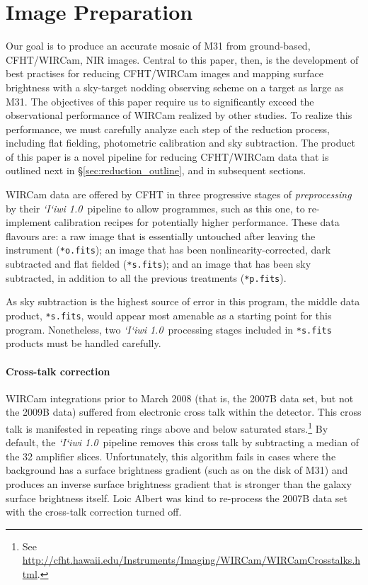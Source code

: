 \documentclass[iop]{emulateapj}
\newcommand{\sw}[1]{\textit{#1}} %
\newcommand{\iiwione}{\sw{`I`iwi 1.0}}
\newcommand{\androids}{\textsc{androids}}
\begin{document}

\section{Image Preparation}
\label{sec:reduction}

Our goal is to produce an accurate mosaic of M31 from ground-based, CFHT/WIRCam, NIR images.
Central to this paper, then, is the development of best practises for reducing CFHT/WIRCam images and mapping surface brightness with a sky-target nodding observing scheme on a target as large as M31.
The objectives of this paper require us to significantly exceed the observational performance of WIRCam realized by other studies.
To realize this performance, we must carefully analyze each step of the reduction process, including flat fielding, photometric calibration and sky subtraction.
The product of this paper is a novel pipeline for reducing CFHT/WIRCam data that is outlined next in \S\ref{sec:reduction_outline}, and in subsequent sections.

WIRCam data are offered by CFHT in three progressive stages of \emph{preprocessing} by their \iiwione\ pipeline to allow programmes, such as this one, to re-implement calibration recipes for potentially higher performance.
These data flavours are: a raw image that is essentially untouched after leaving the instrument (\texttt{*o.fits}); an image that has been nonlinearity-corrected, dark subtracted and flat fielded (\texttt{*s.fits}); and an image that has been sky subtracted, in addition to all the previous treatments (\texttt{*p.fits}).

As sky subtraction is the highest source of error in this program, the middle data product, \texttt{*s.fits}, would appear most amenable as a starting point for this program.
Nonetheless, two \iiwione\ processing stages included in \texttt{*s.fits} products must be handled carefully.

\paragraph{Cross-talk correction} WIRCam integrations prior to March 2008 (that is, the 2007B data set, but not the 2009B data) suffered from electronic cross talk within the detector.
This cross talk is manifested in repeating rings above and below saturated stars.\footnote{See \url{http://cfht.hawaii.edu/Instruments/Imaging/WIRCam/WIRCamCrosstalks.html}.}
By default, the \iiwione\ pipeline removes this cross talk by subtracting a median of the 32 amplifier slices.
Unfortunately, this algorithm fails in cases where the background has a surface brightness gradient (such as on the disk of M31) and produces an inverse surface brightness gradient that is stronger than the galaxy surface brightness itself.
Loic Albert was kind to re-process the 2007B data set with the cross-talk correction turned off.
\end{document}
